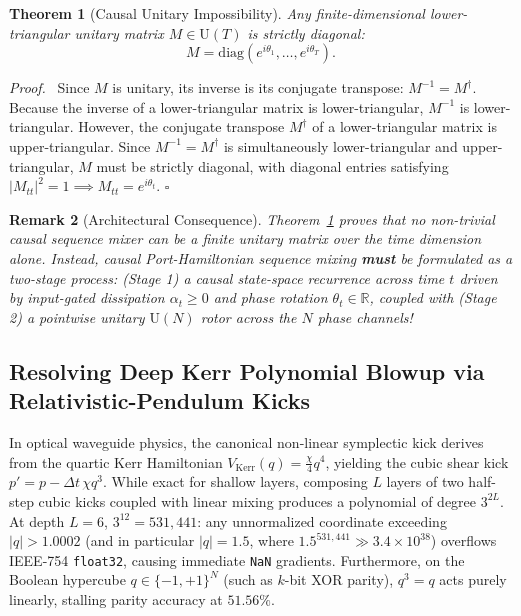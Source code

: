 \documentclass[11pt,a4paper]{article}
\newtheorem{theorem}{Theorem}[section]
\newtheorem{remark}[theorem]{Remark}
\newenvironment{proof}{\par\noindent\textit{Proof.}\ }{\hfill$\square$\par\vspace{0.5em}}
\begin{document}
\begin{theorem}[Causal Unitary Impossibility]
\label{thm:lower_triangular_unitary}
Any finite-dimensional lower-triangular unitary matrix $M \in \mathrm{U}(T)$ is strictly diagonal:
\begin{equation}
    M = \mathrm{diag}(e^{i\theta_1}, \dots, e^{i\theta_T}).
\end{equation}
\end{theorem}
\begin{proof}
Since $M$ is unitary, its inverse is its conjugate transpose: $M^{-1} = M^\dagger$. Because the inverse of a lower-triangular matrix is lower-triangular, $M^{-1}$ is lower-triangular. However, the conjugate transpose $M^\dagger$ of a lower-triangular matrix is upper-triangular. Since $M^{-1} = M^\dagger$ is simultaneously lower-triangular and upper-triangular, $M$ must be strictly diagonal, with diagonal entries satisfying $|M_{tt}|^2 = 1 \implies M_{tt} = e^{i\theta_t}$.
\end{proof}

\begin{remark}[Architectural Consequence]
Theorem~\ref{thm:lower_triangular_unitary} proves that no non-trivial causal sequence mixer can be a finite unitary matrix over the time dimension alone. Instead, causal Port-Hamiltonian sequence mixing \textbf{must} be formulated as a two-stage process: (Stage 1) a causal state-space recurrence across time $t$ driven by input-gated dissipation $\alpha_t \ge 0$ and phase rotation $\theta_t \in \mathbb{R}$, coupled with (Stage 2) a pointwise unitary $\mathrm{U}(N)$ rotor across the $N$ phase channels!
\end{remark}

\subsection{Resolving Deep Kerr Polynomial Blowup via Relativistic-Pendulum Kicks}
In optical waveguide physics, the canonical non-linear symplectic kick derives from the quartic Kerr Hamiltonian $V_{\text{Kerr}}(q) = \frac{\chi}{4}q^4$, yielding the cubic shear kick $p' = p - \Delta t\, \chi q^3$. While exact for shallow layers, composing $L$ layers of two half-step cubic kicks coupled with linear mixing produces a polynomial of degree $3^{2L}$. At depth $L=6$, $3^{12} = 531,441$: any unnormalized coordinate exceeding $|q| > 1.0002$ (and in particular $|q| = 1.5$, where $1.5^{531,441} \gg 3.4\times 10^{38}$) overflows IEEE-754 \texttt{float32}, causing immediate \texttt{NaN} gradients. Furthermore, on the Boolean hypercube $q \in \{-1, +1\}^N$ (such as $k$-bit XOR parity), $q^3 = q$ acts purely linearly, stalling parity accuracy at $51.56\%$.
\end{document}
